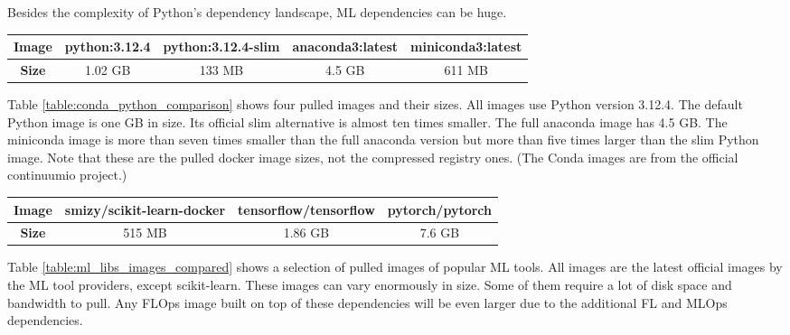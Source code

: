 Besides the complexity of Python's dependency landscape, ML dependencies can be huge.
\begin{changemargin}{0cm}{0cm}
    \centering
    \begin{tabular}{|c||c|c|c|c|}
        \hline
            \textbf{Image} & python:3.12.4 & python:3.12.4-slim & anaconda3:latest & miniconda3:latest \\
        \hline
            \textbf{Size} & 1.02 GB & 133 MB & 4.5 GB & 611 MB
        \\
        \hline
    \end{tabular}
    \label{table:conda_python_comparison}
\end{changemargin}

Table \ref{table:conda_python_comparison} shows four pulled images and their sizes.
All images use Python version 3.12.4.
The default Python image is one GB in size.
Its official slim alternative is almost ten times smaller.
The full anaconda image has 4.5 GB.
The miniconda image is more than seven times smaller than the full anaconda version but more than five times larger than the slim Python image.
Note that these are the pulled docker image sizes, not the compressed registry ones.
(The Conda images are from the official continuumio project.)

\begin{changemargin}{0cm}{0cm}
    \centering
    \begin{tabular}{|c||c|c|c|}
        \hline
            \textbf{Image} & smizy/scikit-learn-docker & tensorflow/tensorflow & pytorch/pytorch \\
        \hline
            \textbf{Size} & 515 MB & 1.86 GB & 7.6 GB
        \\
        \hline
    \end{tabular}
    \label{table:ml_libs_images_compared}
\end{changemargin}

Table \ref{table:ml_libs_images_compared} shows a selection of pulled images of popular ML tools.
All images are the latest official images by the ML tool providers, except scikit-learn.
These images can vary enormously in size.
Some of them require a lot of disk space and bandwidth to pull.
Any FLOps image built on top of these dependencies will be even larger due to the additional FL and MLOps dependencies.
